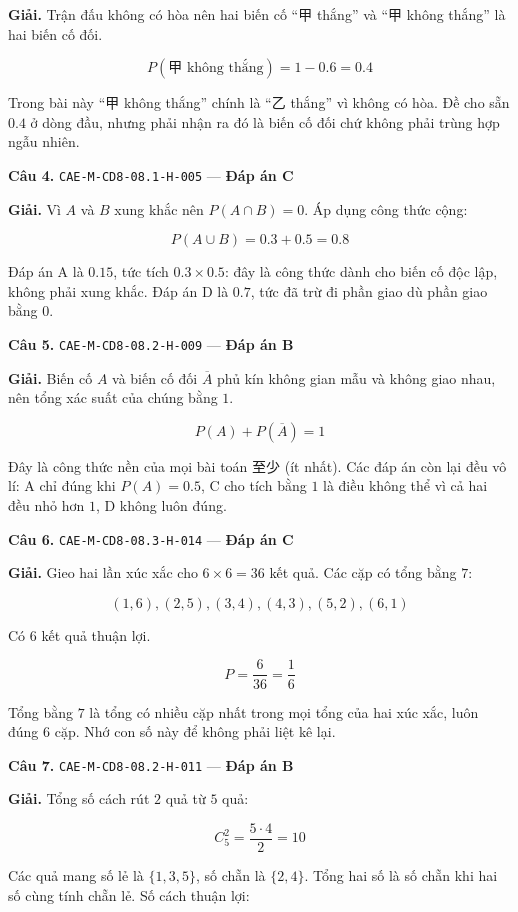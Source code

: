 \documentclass[11pt, a4paper]{article}
\begin{document}
\textbf{Giải.} Trận đấu không có hòa nên hai biến cố “甲 thắng” và “甲 không thắng” là hai biến cố đối.

$$P(\text{甲 không thắng}) = 1 - 0.6 = 0.4$$

 Trong bài này “甲 không thắng” chính là “乙 thắng” vì không có hòa. Đề cho sẵn $0.4$ ở dòng đầu, nhưng phải nhận ra đó là biến cố đối chứ không phải trùng hợp ngẫu nhiên.

\textbf{Câu 4.} \texttt{CAE-M-CD8-08.1-H-005} — \textbf{Đáp án C}

\textbf{Giải.} Vì $A$ và $B$ xung khắc nên $P(A \cap B) = 0$. Áp dụng công thức cộng:

$$P(A \cup B) = 0.3 + 0.5 = 0.8$$

 Đáp án A là $0.15$, tức tích $0.3 \times 0.5$: đây là công thức dành cho biến cố độc lập, không phải xung khắc. Đáp án D là $0.7$, tức đã trừ đi phần giao dù phần giao bằng $0$.

\textbf{Câu 5.} \texttt{CAE-M-CD8-08.2-H-009} — \textbf{Đáp án B}

\textbf{Giải.} Biến cố $A$ và biến cố đối $\overline{A}$ phủ kín không gian mẫu và không giao nhau, nên tổng xác suất của chúng bằng $1$.

$$P(A) + P(\overline{A}) = 1$$

 Đây là công thức nền của mọi bài toán 至少 (ít nhất). Các đáp án còn lại đều vô lí: A chỉ đúng khi $P(A) = 0.5$, C cho tích bằng $1$ là điều không thể vì cả hai đều nhỏ hơn $1$, D không luôn đúng.

\textbf{Câu 6.} \texttt{CAE-M-CD8-08.3-H-014} — \textbf{Đáp án C}

\textbf{Giải.} Gieo hai lần xúc xắc cho $6 \times 6 = 36$ kết quả. Các cặp có tổng bằng $7$:

$$(1,6), (2,5), (3,4), (4,3), (5,2), (6,1)$$

Có $6$ kết quả thuận lợi.

$$P = \frac{6}{36} = \frac{1}{6}$$

 Tổng bằng $7$ là tổng có nhiều cặp nhất trong mọi tổng của hai xúc xắc, luôn đúng $6$ cặp. Nhớ con số này để không phải liệt kê lại.

\textbf{Câu 7.} \texttt{CAE-M-CD8-08.2-H-011} — \textbf{Đáp án B}

\textbf{Giải.} Tổng số cách rút $2$ quả từ $5$ quả:

$$C_5^2 = \frac{5 \cdot 4}{2} = 10$$

Các quả mang số lẻ là $\{1, 3, 5\}$, số chẵn là $\{2, 4\}$. Tổng hai số là số chẵn khi hai số cùng tính chẵn lẻ. Số cách thuận lợi:
\end{document}
